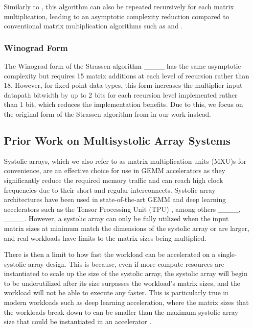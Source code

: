 Similarly to , this algorithm can also be repeated recursively for each matrix \block multiplication, leading to an asymptotic complexity reduction compared to conventional matrix multiplication algorithms such as  and .

\subsubsection{Winograd Form}
The Winograd form of the Strassen algorithm ____ has the same asymptotic complexity but requires 15 matrix \block additions at each level of recursion rather than 18.
However, for fixed-point data types, this form increases the multiplier input datapath bitwidth by up to 2 bits for each recursion level implemented rather than 1 bit, which reduces the implementation benefits.
Due to this, we focus on the original form of the Strassen algorithm from \seq in our work instead.

\subsection{Prior Work on Multisystolic Array Systems}
\label{multi-sys}
Systolic arrays, which we also refer to as matrix multiplication units (MXU)s for convenience, are an effective choice for use in GEMM accelerators as they significantly reduce the required memory traffic and can reach high clock frequencies due to their short and regular interconnects.
Systolic array architectures have been used in state-of-the-art GEMM and deep learning accelerators such as the Tensor Processing Unit (TPU) \citeTPU, among others ____, ____.
However, a systolic array can only be fully utilized when the input matrix sizes at minimum match the dimensions of the systolic array or are larger, and real workloads have limits to the matrix sizes being multiplied.

There is then a limit to how fast the workload can be accelerated on a single-systolic array design.
This is because, even if more compute resources are instantiated to scale up the size of the systolic array, the systolic array will begin to be underutilized after its size surpasses the workload's matrix sizes, and the workload will not be able to execute any faster.
This is particularly true in modern workloads such as deep learning acceleration, where the matrix sizes that the workloads break down to can be smaller than the maximum systolic array size that could be instantiated in an accelerator \citeMultiSys.

